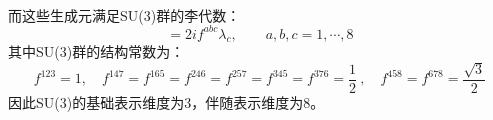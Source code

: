 \begin{itemize}
\begin{align}
    \end{align}
    而这些生成元满足SU(3)群的李代数：
    \begin{equation}
        [\lambda_a, \lambda_b] = 2i f^{abc}\lambda_c,\qquad a,b,c = 1,\cdots,8
    \end{equation}
    其中SU(3)群的结构常数为：
    \begin{equation}
        f^{123} = 1, \quad f^{147} = f^{165} = f^{246} = f^{257} = f^{345} = f^{376} = \frac{1}{2} \ , \quad f^{458} = f^{678} = \frac{\sqrt{3}}{2}
    \end{equation}
    因此SU(3)的基础表示维度为3，伴随表示维度为8。
\end{itemize}





